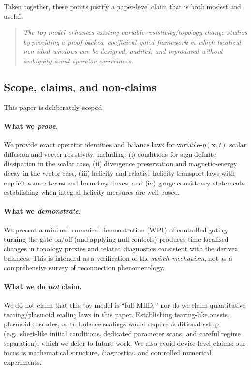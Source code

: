 \documentclass[11pt]{article}
\theoremstyle{plain}
\theoremstyle{definition}
\theoremstyle{remark}
\begin{document}
Taken together, these points justify a paper-level claim that is both modest and useful:
\begin{quote}
\emph{The toy model enhances existing variable-resistivity/topology-change studies by providing a proof-backed, coefficient-gated framework in which localized non-ideal windows can be designed, audited, and reproduced without ambiguity about operator correctness.}
\end{quote}

\subsection{Scope, claims, and non-claims}\label{sec:intro_scope}
This paper is deliberately scoped.

\paragraph{What we \emph{prove}.}
We provide exact operator identities and balance laws for variable-$\eta(\mathbf{x},t)$ scalar diffusion and vector resistivity, including:
(i) conditions for sign-definite dissipation in the scalar case,
(ii) divergence preservation and magnetic-energy decay in the vector case,
(iii) helicity and relative-helicity transport laws with explicit source terms and boundary fluxes,
and (iv) gauge-consistency statements establishing when integral helicity measures are well-posed.

\paragraph{What we \emph{demonstrate}.}
We present a minimal numerical demonstration (WP1) of controlled gating: turning the gate on/off (and applying null controls) produces time-localized changes in topology proxies and related diagnostics consistent with the derived balances. This is intended as a verification of the \emph{switch mechanism}, not as a comprehensive survey of reconnection phenomenology.

\paragraph{What we do \emph{not} claim.}
We do not claim that this toy model is ``full MHD,'' nor do we claim quantitative tearing/plasmoid scaling laws in this paper. Establishing tearing-like onsets, plasmoid cascades, or turbulence scalings would require additional setup (e.g.\ sheet-like initial conditions, dedicated parameter scans, and careful regime separation), which we defer to future work. We also avoid device-level claims; our focus is mathematical structure, diagnostics, and controlled numerical experiments.
\end{document}

